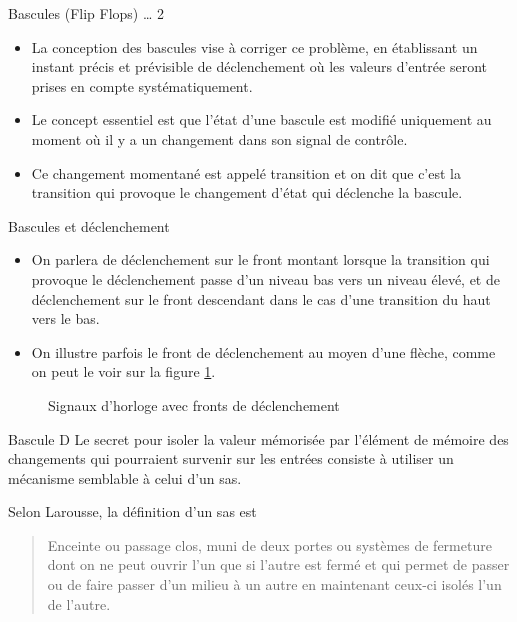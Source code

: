 \documentclass[presentation]{beamer}
\begin{document}
\begin{frame}[label={sec:orge4e00f7}]{Bascules (Flip Flops) \ldots{} 2}
\begin{itemize}
\item La conception des bascules vise à corriger ce problème, en établissant un instant précis et prévisible de déclenchement où les valeurs d'entrée seront prises en compte systématiquement.

\item Le concept essentiel est que l'état d'une bascule est modifié uniquement au moment où il y a un changement dans son signal de contrôle.

\item Ce changement momentané est appelé \alert{transition} et on dit que c'est la transition qui provoque le changement d'état qui \alert{déclenche} la bascule.
\end{itemize}
\end{frame}

\begin{frame}[label={sec:org20d6ca0}]{Bascules et déclenchement}
\begin{itemize}
\item On parlera de déclenchement sur le \alert{front montant} lorsque la transition qui provoque le déclenchement passe d'un niveau bas vers un niveau élevé, et de déclenchement sur le \alert{front descendant} dans le cas d'une transition du haut vers le bas.

\item On illustre parfois le front de déclenchement au moyen d'une flèche, comme on peut le voir sur la figure \ref{fig:org755021d}.
\end{itemize}


\begin{figure}[htbp]
\centering

\caption{\label{fig:org755021d}Signaux d'horloge avec fronts de déclenchement}
\end{figure}
\end{frame}

\begin{frame}[label={sec:orgf5e9b88}]{Bascule D}
Le secret pour isoler la valeur mémorisée par l'élément de mémoire des changements qui pourraient survenir sur les entrées consiste à utiliser un mécanisme semblable à celui d'un sas.

Selon Larousse, la définition d'un sas est

\begin{quote}
Enceinte ou passage clos, muni de deux portes ou systèmes de fermeture
dont on ne peut ouvrir l'un que si l'autre est fermé et qui permet de
passer ou de faire passer d'un milieu à un autre en maintenant ceux-ci
isolés l'un de l'autre.
\end{quote}
\end{frame}
\end{document}
